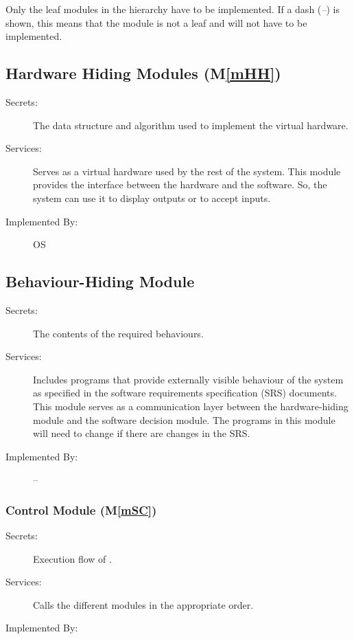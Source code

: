 \documentclass[12pt, titlepage]{article}
\newcommand{\mref}[1]{M\ref{#1}}
\begin{document}
Only the leaf modules in the hierarchy have to be implemented. If a dash
(\emph{--}) is shown, this means that the module is not a leaf and will not have
to be implemented.

\subsection{Hardware Hiding Modules (\mref{mHH})}

\begin{description}
\item[Secrets:]The data structure and algorithm used to implement the virtual
  hardware.
\item[Services:]Serves as a virtual hardware used by the rest of the
  system. This module provides the interface between the hardware and the
  software. So, the system can use it to display outputs or to accept inputs.
\item[Implemented By:] OS
\end{description}

\subsection{Behaviour-Hiding Module}

\begin{description}
\item[Secrets:]The contents of the required behaviours.
\item[Services:]Includes programs that provide externally visible behaviour of
  the system as specified in the software requirements specification (SRS)
  documents. This module serves as a communication layer between the
  hardware-hiding module and the software decision module. The programs in this
  module will need to change if there are changes in the SRS.
\item[Implemented By:] --
\end{description}

\subsubsection{\progname{} Control Module (\mref{mSC})}

\begin{description}
\item[Secrets:]Execution flow of \progname{}.
\item[Services:]Calls the different modules in the appropriate order.
\item[Implemented By:] \progname{}
\end{description}
\end{document}

